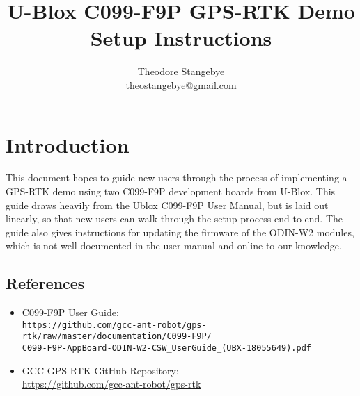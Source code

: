 \documentclass{article}%
\begin{document}
\title{U-Blox C099-F9P GPS-RTK Demo Setup Instructions}
\author{Theodore Stangebye\\
\href{mailto:theostangebye@gmail.com}{theostangebye@gmail.com}  }
\maketitle






\vspace*{\fill}
\tableofcontents
\vspace*{\fill}

\newpage

\section{Introduction}
This document hopes to guide new users through the process of implementing a GPS-RTK demo using two C099-F9P development boards from U-Blox. 
This guide draws heavily from the Ublox C099-F9P User Manual, but is laid out linearly, so that new users can walk through the setup process end-to-end.
The guide also gives instructions for updating the firmware of the ODIN-W2 modules, which is not well documented in the user manual and online to our knowledge.

\subsection{References}\label{ref:references}
	\begin{itemize}
		\item C099-F9P User Guide:\\ \href{https://github.com/gcc-ant-robot/gps-rtk/raw/master/documentation/C099-F9P/C099-F9P-AppBoard-ODIN-W2-CSW_UserGuide_(UBX-18055649).pdf}{\texttt{https://github.com/gcc-ant-robot/gps-rtk/raw/master/documentation/C099-F9P/\\C099-F9P-AppBoard-ODIN-W2-CSW\_UserGuide\_(UBX-18055649).pdf}}
		\item GCC GPS-RTK GitHub Repository: \\
		\url{https://github.com/gcc-ant-robot/gps-rtk}
	\end{itemize}
\end{document}
